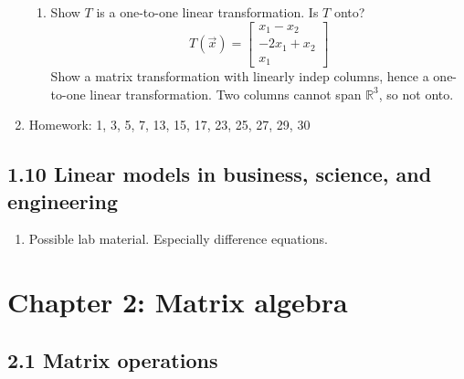 \documentclass{article}
\begin{document}
\begin{enumerate}
\begin{enumerate}
\item Show $T$ is a one-to-one linear transformation. Is $T$ onto?
\[
T(\vec{x}) = 
\left[
\begin{array}{c}
x_1-x_2 \\
-2x_1+x_2 \\
x_1
\end{array}
\right]
\]
Show a matrix transformation with linearly indep columns, hence a one-to-one linear transformation. Two columns cannot span $\mathbb{R}^3$, so not onto.
\end{enumerate}

\item Homework: 1, 3, 5, 7, 13, 15, 17, 23, 25, 27, 29, 30

\end{enumerate}

\subsection{1.10 Linear models in business, science, and engineering}

\begin{enumerate}

\item Possible lab material. Especially difference equations.

\end{enumerate}

\section{Chapter 2: Matrix algebra} 

\subsection{2.1 Matrix operations}
\end{document}
